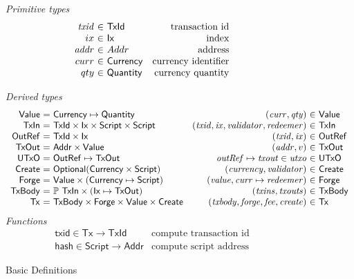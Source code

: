 \documentclass[11pt,a4paper]{article}
\newcommand{\powerset}[1]{\mathbb{P}~#1}
\newcommand{\var}[1]{\mathit{#1}}
\newcommand{\fun}[1]{\mathsf{#1}}
\newcommand{\type}[1]{\mathsf{#1}}
\newcommand{\Script}{\type{Script}}
\newcommand{\TxId}{\type{TxId}}
\newcommand{\Ix}{\type{Ix}}
\newcommand{\Addr}{\type{Addr}}
\newcommand{\Currency}{\type{Currency}}
\newcommand{\Quantity}{\type{Quantity}}
\newcommand{\Value}{\type{Value}}
\newcommand{\TxIn}{\type{TxIn}}
\newcommand{\OutRef}{\type{OutRef}}
\newcommand{\TxOut}{\type{TxOut}}
\newcommand{\UTxO}{\type{UTxO}}
\newcommand{\Create}{\type{Create}}
\newcommand{\Forge}{\type{Forge}}
\newcommand{\TxBody}{\type{TxBody}}
\newcommand{\Tx}{\type{Tx}}
\begin{document}
\begin{figure}

\emph{Primitive types}
%
\begin{equation*}
\begin{array}{r@{~\in~}lr}
  \var{txid}
& \TxId
& \text{transaction id}
\\
  ix
& \Ix
& \text{index}
\\
  \var{addr}
& Addr
& \text{address}
\\
  curr
& \Currency
& \text{currency identifier}
\\
  qty
& \Quantity
& \text{currency quantity}
\end{array}
\end{equation*}

%
\emph{Derived types}
%
\begin{equation*}
\begin{array}{r@{~=~}lc@{}r@{~\in~}l}
  \Value
& \Currency \mapsto \Quantity
&
& (\var{curr}, \var{qty})
& \Value
\\
  \TxIn
& \TxId \times \Ix \times \Script \times \Script
&
& (\var{txid}, \var{ix}, \var{validator}, \var{redeemer})
& \TxIn
\\
  \OutRef
& \TxId \times \Ix
&
& (\var{txid}, \var{ix})
& \OutRef
\\
  \TxOut
& \Addr \times \Value
&
& (\var{addr}, v)
& \TxOut
\\
  \UTxO
& \OutRef \mapsto \TxOut
&
& \var{outRef} \mapsto \var{txout} \in \var{utxo}
& \UTxO
\\
  \Create
& \type{Optional} (\Currency \times \Script)
&
& (\var{currency}, \var{validator})
& \Create
\\
  \Forge
& \Value \times (\Currency \mapsto \Script)
&
& (\var{value}, \var{curr} \mapsto \var{redeemer})
& \Forge
\\
  \TxBody
& \powerset{\TxIn} \times (\Ix \mapsto \TxOut)
&
& (\var{txins}, \var{txouts})
& \TxBody
\\
  \Tx
& \TxBody \times \Forge \times \Value \times \Create
&
& (\var{txbody}, \var{forge}, \var{fee}, \var{create})
& \Tx
\end{array}
\end{equation*}
%
\emph{Functions}
%
\begin{equation*}
\begin{array}{lr}
  \fun{txid} \in \Tx \to \TxId
& \text{compute transaction id}
\\
  \fun{hash} \in \Script \to \Addr
& \text{compute script address}
\end{array}
\end{equation*}

\caption{Basic Definitions}
\label{fig:basic_definitions}
\end{figure}
\end{document}
